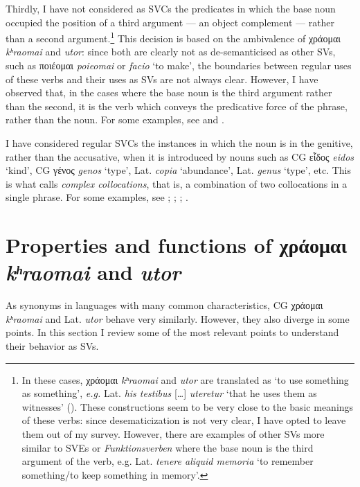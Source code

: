 \documentclass[output=paper,colorlinks,citecolor=brown]{langscibook}
\begin{document}
Thirdly, I have not considered as SVCs the predicates in which the base noun occupied the
position of a third argument --- an object complement --- rather than a second
argument.\footnote{In these cases, χράομαι \emph{kʰraomai} and
  \emph{utor} are translated as `to use something as something', \emph{e.g.} Lat.
  \emph{his testibus} {[}\ldots{]} \emph{uteretur} `that he uses them as witnesses'
  (). These constructions seem to be very
  close to the basic meanings of these verbs: since desematicization is not very clear, I
  have opted to leave them out of my survey. However, there are examples of other SVs more
  similar to SVEs or \emph{Funktionsverben} where the base noun is the third argument of
  the verb, e.g. Lat. \emph{tenere aliquid memoria} `to remember something/to keep
  something in memory'.} This decision is based on the ambivalence of χράομαι
\emph{kʰraomai} and \emph{utor}: since both are clearly not as
de-semanticised as other SVs, such as ποιέομαι \emph{poieomai} or \emph{facio} `to make',
the boundaries between regular uses of these verbs and their uses as SVs are not always
clear. However, I have observed that, in the cases where the base noun is the third
argument rather than the second, it is the verb which conveys the predicative force of the
phrase, rather than the noun. For some examples, see  and .

I have considered regular SVCs the instances in which the noun is in the genitive, rather
than the accusative, when it is introduced by nouns such as CG εἶδος \emph{eidos}
`kind', CG γένος \emph{genos} `type', Lat. \emph{copia} `abundance', Lat. \emph{genus}
`type', etc. This is what \citet[55-60]{koike_colocaciones_2001} calls \emph{complex
  collocations}, that is, a combination of two collocations in a single phrase. For some
examples, see ; ; ; .

\section{Properties and functions of χράομαι \emph{kʰraomai} and
  \emph{utor}}\label{sec:ma:4}

As synonyms in languages with many common characteristics, CG χράομαι
\emph{kʰraomai} and Lat. \emph{utor} behave very similarly. However,
they also diverge in some points. In this section I review some of the most relevant
points to understand their behavior as SVs.
\end{document}
